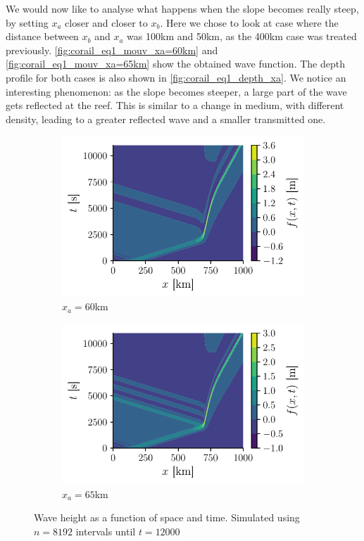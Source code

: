 We would now like to analyse what happens when the slope becomes really steep, by setting \(x_a\) closer and closer to \(x_b\). Here we chose to look at case where the distance between \(x_b\) and \(x_a\) was 100km and 50km, as the 400km case was treated previously. \autoref{fig:corail_eq1_mouv_xa=60km} and \autoref{fig:corail_eq1_mouv_xa=65km} show the obtained wave function. The depth profile for both cases is also shown in \autoref{fig:corail_eq1_depth_xa}. We notice an interesting phenomenon: as the slope becomes steeper, a large part of the wave gets reflected at the reef. This is similar to a change in medium, with different density, leading to a greater reflected wave and a smaller transmitted one.

\begin{figure}[h]
    \centering
    \begin{subfigure}{0.48\linewidth}
        \centering
        \includegraphics[width=\linewidth]{figures/corail_eq1_movement_xa=600000.pdf}
        \caption{\(x_a = 60\)km}
        \label{fig:corail_eq1_mouv_xa=60km}
    \end{subfigure}
    \begin{subfigure}{0.48\linewidth}
        \centering
        \includegraphics[width=\linewidth]{figures/corail_eq1_movement_xa=650000.pdf}
        \caption{\(x_a = 65\)km}
        \label{fig:corail_eq1_mouv_xa=65km}
    \end{subfigure}
    \caption{Wave height as a function of space and time. Simulated using \(n=8192\) intervals until \(t=12000\)}
    \label{fig:corail_eq1_mouv_xa}
\end{figure}

